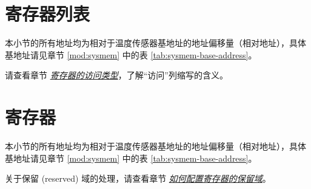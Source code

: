 \documentclass[main\_\_CN.tex]{subfiles}
\begin{document}



\newpage
\hypertarget{tmpsen-reg-summ}{}
\section{寄存器列表}
\label{sec:tmpsen-reg-summ}


本小节的所有地址均为相对于温度传感器基地址的地址偏移量（相对地址），具体基地址请见章节 \ref{mod:sysmem} \textit{} 中的表 \ref{tab:sysmem-base-address}。

请查看章节 \hyperref[glossary-access-types]{\textit{寄存器的访问类型}}，了解“访问”列缩写的含义。






\newpage
\section{寄存器}

本小节的所有地址均为相对于温度传感器基地址的地址偏移量（相对地址），具体基地址请见章节 \ref{mod:sysmem} \textit{} 中的表 \ref{tab:sysmem-base-address}。

关于保留 (reserved) 域的处理，请查看章节 \hyperref[programming-reserved-field]{\textit{如何配置寄存器的保留域}}。


\end{document}
